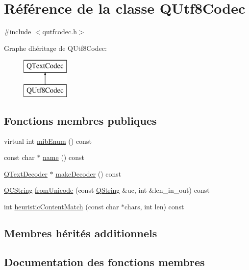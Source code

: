 \hypertarget{class_q_utf8_codec}{}\section{Référence de la classe Q\+Utf8\+Codec}
\label{class_q_utf8_codec}


{\ttfamily \#include $<$qutfcodec.\+h$>$}

Graphe d\textquotesingle{}héritage de Q\+Utf8\+Codec\+:\begin{figure}[H]
\begin{center}
\leavevmode
\includegraphics[height=2.000000cm]{class_q_utf8_codec}
\end{center}
\end{figure}
\subsection*{Fonctions membres publiques}
\begin{DoxyCompactItemize}
\item 
virtual int \hyperlink{class_q_utf8_codec_ac3776361e8eedbbbe5353159c7268695}{mib\+Enum} () const 
\item 
const char $\ast$ \hyperlink{class_q_utf8_codec_a9c5805cc64dc7b714e12ff6ca00c4116}{name} () const 
\item 
\hyperlink{class_q_text_decoder}{Q\+Text\+Decoder} $\ast$ \hyperlink{class_q_utf8_codec_ae50b523b956cf0bfdaaa3852d15043a6}{make\+Decoder} () const 
\item 
\hyperlink{class_q_c_string}{Q\+C\+String} \hyperlink{class_q_utf8_codec_a6ba4ab29e5f88609203a9358f0144d15}{from\+Unicode} (const \hyperlink{class_q_string}{Q\+String} \&uc, int \&len\+\_\+in\+\_\+out) const 
\item 
int \hyperlink{class_q_utf8_codec_ae2c830a33bc0694178ebb6c8e5a76857}{heuristic\+Content\+Match} (const char $\ast$chars, int len) const 
\end{DoxyCompactItemize}
\subsection*{Membres hérités additionnels}


\subsection{Documentation des fonctions membres}
\hypertarget{class_q_utf8_codec_a6ba4ab29e5f88609203a9358f0144d15}{}
